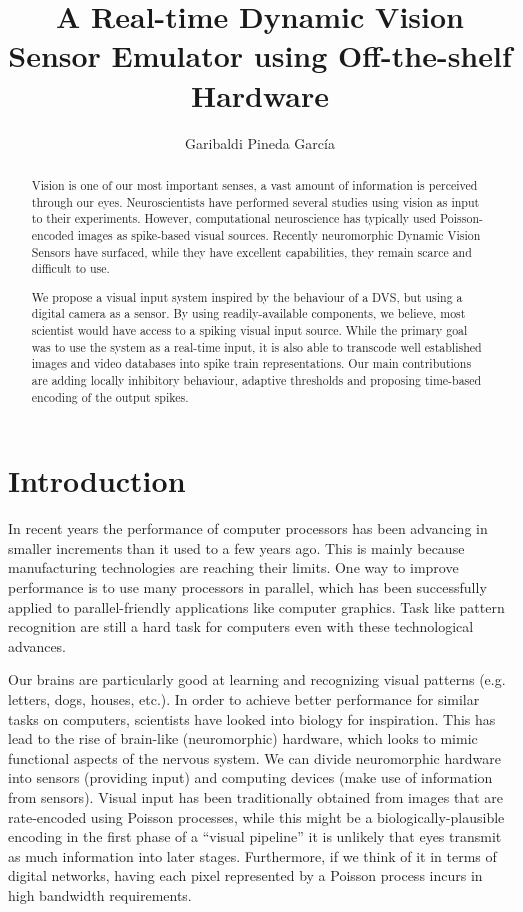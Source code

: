 \documentclass[twocolumn]{article}
\title{A Real-time Dynamic Vision Sensor Emulator using Off-the-shelf Hardware}
\author{Garibaldi Pineda García}
\begin{document}
\maketitle
\begin{abstract}
\textsf{Vision is one of our most important senses, a vast amount of information is perceived through our eyes. Neuroscientists have performed several studies using vision as input to their experiments. However, computational neuroscience has typically used Poisson-encoded images as spike-based visual sources. Recently neuromorphic Dynamic Vision Sensors have surfaced, while they have excellent capabilities, they remain scarce and difficult to use.}


\textsf{
We propose a visual input system inspired by the behaviour of a DVS, but using a digital camera as a sensor. By using readily-available components, we believe, most scientist would have access to a spiking visual input source. While the primary goal was to use the system as a real-time input, it is also able to transcode well established images and video databases into spike train representations. Our main contributions are adding locally inhibitory behaviour, adaptive thresholds and proposing time-based encoding of the output spikes.}

\end{abstract}

\section{Introduction}

In recent years the performance of computer processors has been advancing in smaller increments than it used to a few years ago. This is mainly because manufacturing technologies are reaching their limits. One way to improve performance is to use many processors in parallel, which has been successfully applied to parallel-friendly applications like computer graphics. Task like pattern recognition are still a hard task for computers even with these technological advances.

Our brains are particularly good at learning and recognizing visual patterns (e.g. letters, dogs, houses, etc.). In order to achieve better performance for similar tasks on computers, scientists have looked into biology for inspiration. This has lead to the rise of brain-like (neuromorphic) hardware, which looks to mimic functional aspects of the nervous system. We can divide neuromorphic hardware into sensors (providing input) and computing devices (make use of information from sensors). Visual input has been traditionally obtained from images that are rate-encoded using Poisson processes, while this might be a biologically-plausible encoding in the first phase of a ``visual pipeline'' it is unlikely that eyes transmit as much information into later stages. Furthermore, if we think of it in terms of digital networks, having each pixel represented by a Poisson process incurs in high bandwidth requirements. 
\end{document}

